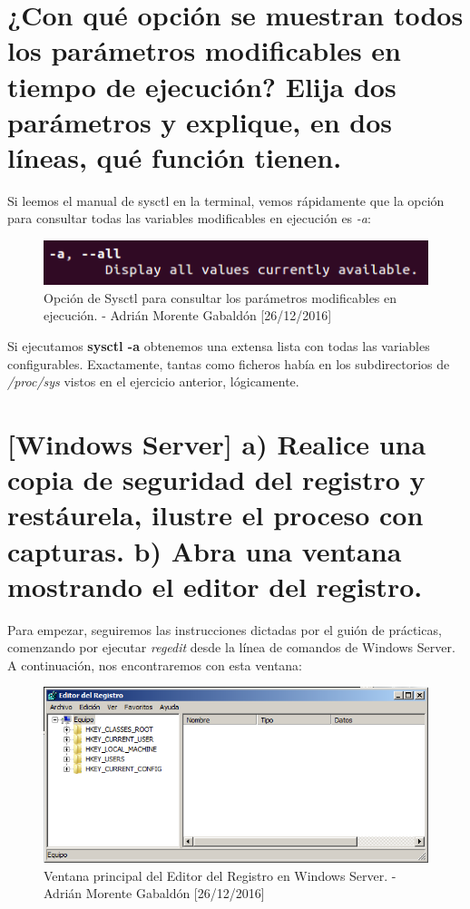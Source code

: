 \section{¿Con qué opción se muestran todos los parámetros modificables en tiempo de ejecución? Elija dos parámetros
y explique, en dos líneas, qué función tienen.}
Si leemos el manual de sysctl en la terminal, vemos rápidamente que la opción para consultar todas las variables
modificables en ejecución es \emph{-a}:
\begin{figure}[H]
	\centering
	\includegraphics[scale=0.7]{sysctl-a}
	\caption{Opción de Sysctl para consultar los parámetros modificables en ejecución. - Adrián Morente Gabaldón [26/12/2016]}
	\label{figura2}
\end{figure}
Si ejecutamos \textbf{sysctl -a} obtenemos una extensa lista con todas las variables configurables. Exactamente,
tantas como ficheros había en los subdirectorios de \emph{/proc/sys} vistos en el ejercicio anterior, lógicamente.

\section{[Windows Server] a) Realice una copia de seguridad del registro y restáurela, ilustre el proceso con capturas.
b) Abra una ventana mostrando el editor del registro.}
Para empezar, seguiremos las instrucciones dictadas por el guión de prácticas, comenzando por ejecutar \emph{regedit}
desde la línea de comandos de Windows Server. A continuación, nos encontraremos con esta ventana:
\begin{figure}[H]
	\centering
	\includegraphics[scale=0.7]{regedit}
	\caption{Ventana principal del Editor del Registro en Windows Server. - Adrián Morente Gabaldón [26/12/2016]}
	\label{figura4}
\end{figure}


